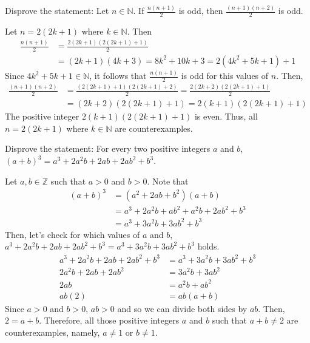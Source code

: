 \documentclass[12pt]{article}
\newcommand{\N}{\mathbb{N}}
\newcommand{\Z}{\mathbb{Z}}
\newenvironment{problem}[2][Problem]{\begin{trivlist}
		\item[\hskip \labelsep {\bfseries #1}\hskip \labelsep {\bfseries #2.}]}{\end{trivlist}}
\newenvironment{solution}[2][Solution]{\begin{trivlist}
		\item[\hskip \labelsep {\bfseries #1}\hskip \labelsep {\bfseries #2.}]}{\end{trivlist}}
\begin{document}
	\begin{problem}{4}
		Disprove the statement: Let $n\in \N$. If $\frac{n(n+1)}{2}$ is odd, then $\frac{(n+1)(n+2)}{2}$ is odd.
		\begin{solution}{}
			Let $n=2(2k+1)$ where $k\in \N$. Then 
			\begin{align*}
				\frac{n(n+1)}{2} &= \frac{2(2k+1)(2(2k+1)+1)}{2}\\
				&= (2k+1)(4k+3) = 8k^{2} + 10k +3 = 2(4k^{2}+5k+1)+1
			\end{align*}
		Since $4k^{2}+5k+1\in \N$, it follows that $\frac{n(n+1)}{2}$ is odd for this values of $n$. Then,
		\begin{align*}
			\frac{(n+1)(n+2)}{2} &= \frac{(2(2k+1)+1)(2(2k+1)+2)}{2} = \frac{2(2k+2)(2(2k+1)+1)}{2}\\
			&= (2k+2)(2(2k+1)+1) = 2(k+1)(2(2k+1)+1)
		\end{align*}
		The positive integer $2(k+1)(2(2k+1)+1)$ is even. Thus, all $n=2(2k+1)$ where $k\in \N$ are counterexamples.
		\end{solution}
	\end{problem}

	\begin{problem}{5}
		Disprove the statement: For every two positive integers $a$ and $b$, $(a+b)^{3}=a^{3}+2a^{2}b+2ab+2ab^{2}+b^{3}$.
		\begin{solution}{}
			Let $a,b\in \Z$ such that $a>0$ and $b>0$. Note that 
			\begin{align*}
				(a+b)^{3} &= (a^{2}+2ab+b^{2})(a+b)\\
				&= a^{3} +2a^{2}b+ab^{2}+a^{2}b+2ab^{2}+b^{3}\\
				&= a^{3} + 3a^{2}b + 3ab^{2} + b^{3}
			\end{align*}
		Then, let's check for which values of $a$ and $b$, $a^{3}+2a^{2}b+2ab+2ab^{2}+b^{3} = a^{3} + 3a^{2}b + 3ab^{2} + b^{3}$ holds.
		\begin{align*}
			a^{3}+2a^{2}b+2ab+2ab^{2}+b^{3} &= a^{3} + 3a^{2}b + 3ab^{2} + b^{3}\\
			2a^{2}b+2ab+2ab^{2} &= 3a^{2}b + 3ab^{2}\\
			2ab &= a^{2}b + ab^{2}\\
			ab(2) &= ab(a+b)
		\end{align*}
	Since $a>0$ and $b>0$, $ab > 0$ and so we can divide both sides by $ab$. Then, $2 = a+b$. Therefore, all those positive integers $a$ and $b$ such that $a+b\neq 2$ are counterexamples, namely, $a\neq 1$ or $b\neq 1$.
		\end{solution}
	\end{problem}
\end{document}
